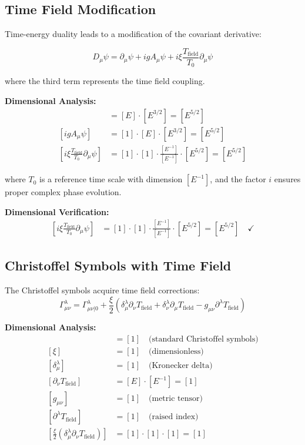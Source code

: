 \documentclass[12pt,a4paper]{report}
\begin{document}
\subsection{Time Field Modification}
\label{subsec:time_field_modification}

Time-energy duality leads to a modification of the covariant derivative:

\begin{equation}
	D_\mu \psi = \partial_\mu \psi + ig A_\mu \psi + i\xi \frac{T_{\text{field}}}{T_0} \partial_\mu \psi
\end{equation}

where the third term represents the time field coupling.

\textbf{Dimensional Analysis:}
\begin{align}
	[\partial_\mu \psi] &= [E] \cdot [E^{3/2}] = [E^{5/2}] \\
	[ig A_\mu \psi] &= [1] \cdot [E] \cdot [E^{3/2}] = [E^{5/2}] \\
	[i\xi \frac{T_{\text{field}}}{T_0} \partial_\mu \psi] &= [1] \cdot [1] \cdot \frac{[E^{-1}]}{[E^{-1}]} \cdot [E^{5/2}] = [E^{5/2}]
\end{align}

where $T_0$ is a reference time scale with dimension $[E^{-1}]$, and the factor $i$ ensures proper complex phase evolution.

\textbf{Dimensional Verification:}
\begin{align}
	\left[i\xi \frac{T_{\text{field}}}{T_0} \partial_\mu \psi\right] &= [1] \cdot [1] \cdot \frac{[E^{-1}]}{[E^{-1}]} \cdot [E^{5/2}] = [E^{5/2}] \quad \checkmark
\end{align}
\subsection{Christoffel Symbols with Time Field}
\label{subsec:christoffel_time_field}

The Christoffel symbols acquire time field corrections:
\begin{equation}
	\Gamma^\lambda_{\mu\nu} = \Gamma^\lambda_{\mu\nu|0} + \frac{\xi}{2} \left(\delta^\lambda_\mu \partial_\nu T_{\text{field}} + \delta^\lambda_\nu \partial_\mu T_{\text{field}} - g_{\mu\nu} \partial^\lambda T_{\text{field}}\right)
\end{equation}

\textbf{Dimensional Analysis:}
\begin{align}
	[\Gamma^\lambda_{\mu\nu|0}] &= [1] \quad \text{(standard Christoffel symbols)} \\
	[\xi] &= [1] \quad \text{(dimensionless)} \\
	[\delta^\lambda_\mu] &= [1] \quad \text{(Kronecker delta)} \\
	[\partial_\nu T_{\text{field}}] &= [E] \cdot [E^{-1}] = [1] \\
	[g_{\mu\nu}] &= [1] \quad \text{(metric tensor)} \\
	[\partial^\lambda T_{\text{field}}] &= [1] \quad \text{(raised index)} \\
	\left[\frac{\xi}{2} \left(\delta^\lambda_\mu \partial_\nu T_{\text{field}}\right)\right] &= [1] \cdot [1] \cdot [1] = [1]
\end{align}
\end{document}
